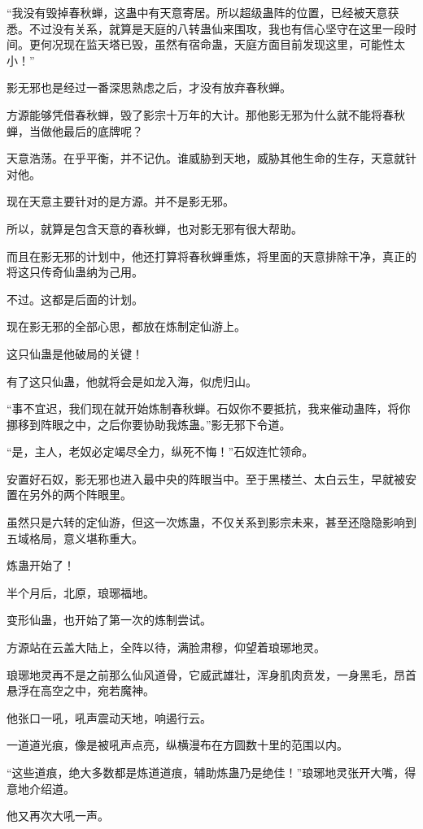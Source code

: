 \begin{this_body}
“我没有毁掉春秋蝉，这蛊中有天意寄居。所以超级蛊阵的位置，已经被天意获悉。不过没有关系，就算是天庭的八转蛊仙来围攻，我也有信心坚守在这里一段时间。更何况现在监天塔已毁，虽然有宿命蛊，天庭方面目前发现这里，可能性太小！”

影无邪也是经过一番深思熟虑之后，才没有放弃春秋蝉。

方源能够凭借春秋蝉，毁了影宗十万年的大计。那他影无邪为什么就不能将春秋蝉，当做他最后的底牌呢？

天意浩荡。在乎平衡，并不记仇。谁威胁到天地，威胁其他生命的生存，天意就针对他。

现在天意主要针对的是方源。并不是影无邪。

所以，就算是包含天意的春秋蝉，也对影无邪有很大帮助。

而且在影无邪的计划中，他还打算将春秋蝉重炼，将里面的天意排除干净，真正的将这只传奇仙蛊纳为己用。

不过。这都是后面的计划。

现在影无邪的全部心思，都放在炼制定仙游上。

这只仙蛊是他破局的关键！

有了这只仙蛊，他就将会是如龙入海，似虎归山。

“事不宜迟，我们现在就开始炼制春秋蝉。石奴你不要抵抗，我来催动蛊阵，将你挪移到阵眼之中，之后你要协助我炼蛊。”影无邪下令道。

“是，主人，老奴必定竭尽全力，纵死不悔！”石奴连忙领命。

安置好石奴，影无邪也进入最中央的阵眼当中。至于黑楼兰、太白云生，早就被安置在另外的两个阵眼里。

虽然只是六转的定仙游，但这一次炼蛊，不仅关系到影宗未来，甚至还隐隐影响到五域格局，意义堪称重大。

炼蛊开始了！

半个月后，北原，琅琊福地。

变形仙蛊，也开始了第一次的炼制尝试。

方源站在云盖大陆上，全阵以待，满脸肃穆，仰望着琅琊地灵。

琅琊地灵再不是之前那么仙风道骨，它威武雄壮，浑身肌肉贲发，一身黑毛，昂首悬浮在高空之中，宛若魔神。

他张口一吼，吼声震动天地，响遏行云。

一道道光痕，像是被吼声点亮，纵横漫布在方圆数十里的范围以内。

“这些道痕，绝大多数都是炼道道痕，辅助炼蛊乃是绝佳！”琅琊地灵张开大嘴，得意地介绍道。

他又再次大吼一声。


\end{this_body}
